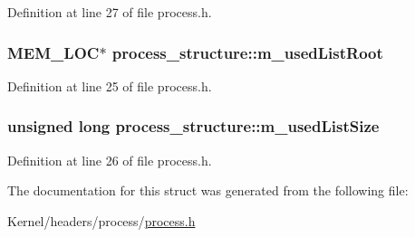 Definition at line 27 of file process.h.

\hypertarget{structprocess__structure_a032625c34f249bf0321269843b0b529e}{
\subsubsection[{m\_\-usedListRoot}]{\setlength{\rightskip}{0pt plus 5cm}MEM\_\-LOC$\ast$ {\bf process\_\-structure::m\_\-usedListRoot}}}
\label{structprocess__structure_a032625c34f249bf0321269843b0b529e}


Definition at line 25 of file process.h.

\hypertarget{structprocess__structure_a542f16320981046ab3943e8c7ed46eab}{
\subsubsection[{m\_\-usedListSize}]{\setlength{\rightskip}{0pt plus 5cm}unsigned long {\bf process\_\-structure::m\_\-usedListSize}}}
\label{structprocess__structure_a542f16320981046ab3943e8c7ed46eab}


Definition at line 26 of file process.h.



The documentation for this struct was generated from the following file:\begin{DoxyCompactItemize}
\item 
Kernel/headers/process/\hyperlink{process_8h}{process.h}\end{DoxyCompactItemize}
